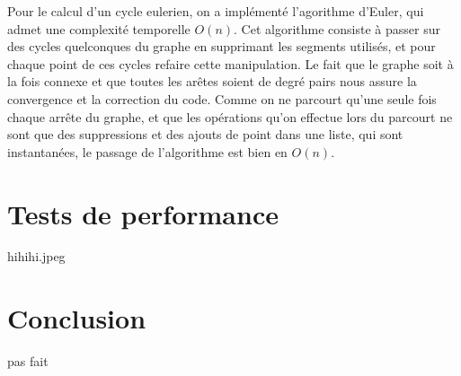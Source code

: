 \documentclass[a4paper,11pt]{article}
\begin{document}
Pour le calcul d'un cycle eulerien, on a implémenté l'agorithme d'Euler, qui admet une complexité temporelle $O(n)$. Cet algorithme consiste à passer sur des cycles quelconques du graphe en supprimant les segments
utilisés, et pour chaque point de ces cycles refaire cette manipulation. Le fait que le graphe soit à la fois connexe et que toutes
les arêtes soient de degré pairs nous assure la convergence et la correction du code. Comme on ne parcourt qu'une seule fois
chaque arrête du graphe, et que les opérations qu'on effectue lors du parcourt ne sont que des suppressions et des ajouts
de point dans une liste, qui sont instantanées, le passage de l'algorithme est bien en $O(n)$.

\section{Tests de performance}

hihihi.jpeg

\section{Conclusion}

pas fait
\end{document}
